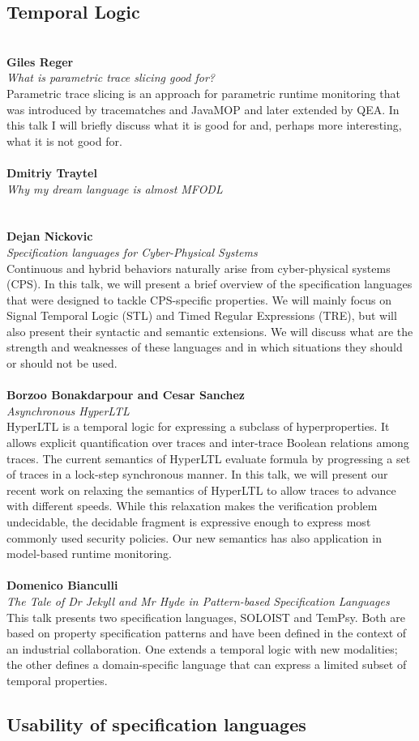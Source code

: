 \documentclass{article}
\newcounter{talkc}
\newcommand{\talk}[3]{\stepcounter{talkc}
\vspace{0.5em}~\\
\noindent
\textbf{#1}\\ 
\noindent\emph{#2}\\ 
\noindent#3\\
}
\begin{document}
\subsection*{Temporal Logic}
%
\talk{Giles Reger}{What is parametric trace slicing good for?}{Parametric trace slicing is an approach for parametric runtime monitoring that was introduced by tracematches and JavaMOP and later extended by QEA. In this talk I will briefly discuss what it is good for and, perhaps more interesting, what it is not good for.}
%
\talk{Dmitriy Traytel}{Why my dream language is almost MFODL}{}
%
\talk{Dejan Nickovic}{ Specification languages for Cyber-Physical Systems}{Continuous and hybrid behaviors naturally arise from cyber-physical systems (CPS). In this talk, we will present a brief overview of the specification languages that were designed to tackle CPS-specific properties. We will mainly focus on Signal Temporal Logic (STL) and Timed Regular Expressions (TRE), but will also present their syntactic and semantic extensions. We will discuss what are the strength and weaknesses of these languages and in which situations they should or should not be used.}
%
%
\talk{Borzoo Bonakdarpour and Cesar Sanchez}{Asynchronous HyperLTL}{HyperLTL is a temporal logic for expressing a subclass of hyperproperties. It allows explicit quantification over traces and inter-trace Boolean relations among traces. The current semantics of HyperLTL evaluate formula by progressing a set of traces in a lock-step synchronous manner. In this talk, we will present our recent work on relaxing the semantics of HyperLTL to allow traces to advance with different speeds. While this relaxation makes the verification problem undecidable, the decidable fragment is expressive enough to express most commonly used security policies. Our new semantics has also application in model-based runtime monitoring.}
%
\talk{Domenico Bianculli}{The Tale of Dr Jekyll and Mr Hyde in Pattern-based Specification Languages}{This talk presents two specification languages, SOLOIST and TemPsy. Both are based on property specification patterns and have been defined in the context of an industrial collaboration. One extends a temporal logic with new modalities; the other defines a domain-specific language  that can express a limited subset of temporal properties.}

\subsection*{Usability of specification languages}
\end{document}
